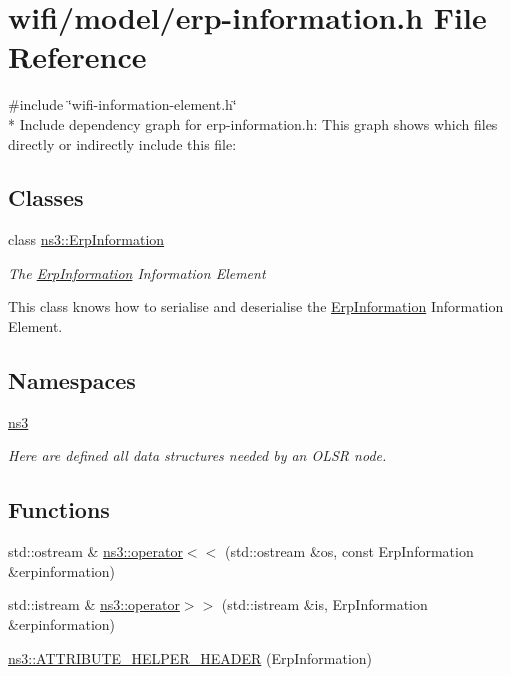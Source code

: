 \hypertarget{erp-information_8h}{}\section{wifi/model/erp-\/information.h File Reference}
\label{erp-information_8h}
{\ttfamily \#include \char`\"{}wifi-\/information-\/element.\+h\char`\"{}}\\*
Include dependency graph for erp-\/information.h\+:
This graph shows which files directly or indirectly include this file\+:
\subsection*{Classes}
\begin{DoxyCompactItemize}
\item 
class \hyperlink{classns3_1_1ErpInformation}{ns3\+::\+Erp\+Information}
\begin{DoxyCompactList}\small\item\em The \hyperlink{classns3_1_1ErpInformation}{Erp\+Information} Information Element

This class knows how to serialise and deserialise the \hyperlink{classns3_1_1ErpInformation}{Erp\+Information} Information Element. \end{DoxyCompactList}\end{DoxyCompactItemize}
\subsection*{Namespaces}
\begin{DoxyCompactItemize}
\item 
 \hyperlink{namespacens3}{ns3}
\begin{DoxyCompactList}\small\item\em Here are defined all data structures needed by an O\+L\+SR node. \end{DoxyCompactList}\end{DoxyCompactItemize}
\subsection*{Functions}
\begin{DoxyCompactItemize}
\item 
std\+::ostream \& \hyperlink{namespacens3_a73b78fecda4d1cb211d4fec57c7f2586}{ns3\+::operator$<$$<$} (std\+::ostream \&os, const Erp\+Information \&erpinformation)
\item 
std\+::istream \& \hyperlink{namespacens3_ae5b0e28ab565d0454f43cd8f58258b18}{ns3\+::operator$>$$>$} (std\+::istream \&is, Erp\+Information \&erpinformation)
\item 
\hyperlink{namespacens3_a6c709780d4be33ecda2b7bfd3209bffb}{ns3\+::\+A\+T\+T\+R\+I\+B\+U\+T\+E\+\_\+\+H\+E\+L\+P\+E\+R\+\_\+\+H\+E\+A\+D\+ER} (Erp\+Information)
\end{DoxyCompactItemize}
